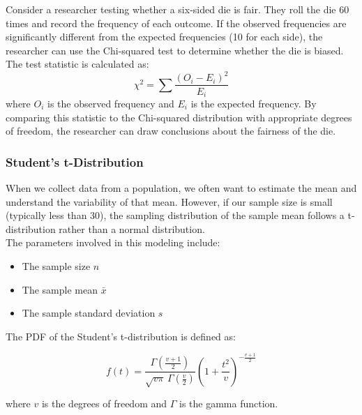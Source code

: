 \begin{example}
    Consider a researcher testing whether a six-sided die is fair. They roll the die 60 times and record the frequency of each outcome. If the observed frequencies are significantly different from the expected frequencies (10 for each side), the researcher can use the Chi-squared test to determine whether the die is biased. The test statistic is calculated as:
\[
\chi^2 = \sum \frac{(O_i - E_i)^2}{E_i}
\]
where \(O_i\) is the observed frequency and \(E_i\) is the expected frequency. By comparing this statistic to the Chi-squared distribution with appropriate degrees of freedom, the researcher can draw conclusions about the fairness of the die.
\end{example}

\subsubsection{Student's t-Distribution}

When we collect data from a population, we often want to estimate the mean and understand the variability of that mean. However, if our sample size is small (typically less than 30), the sampling distribution of the sample mean follows a t-distribution rather than a normal distribution. \\

The parameters involved in this modeling include:
\begin{itemize}
    \item The sample size \( n \)
    \item The sample mean \( \bar{x} \)
    \item The sample standard deviation \( s \)
\end{itemize}

\begin{definition}
    The PDF of the Student's t-distribution is defined as:

\[
f(t) = \frac{\Gamma\left(\frac{v+1}{2}\right)}{\sqrt{v \pi} \, \Gamma\left(\frac{v}{2}\right)} \left(1 + \frac{t^2}{v}\right)^{-\frac{v+1}{2}}
\]

where \( v \) is the degrees of freedom and \( \Gamma \) is the gamma function.
\end{definition}

